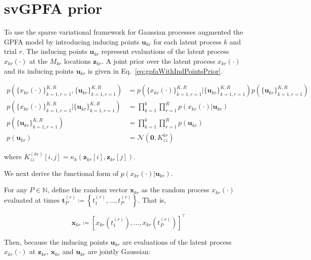 \documentclass[12pt]{article}
\begin{document}
\section{svGPFA prior}

To use the sparse variational framework for Gaussian processes \citet{dunckerAndSahani18} augmented the GPFA model by introducing inducing
points $\mathbf{u}_{kr}$ for each latent process $k$ and trial $r$. The
inducing points $\mathbf{\mathbf{u}}_{kr}$ represent evaluations of the latent
process $x_{kr}(\cdot)$ at the $M_{kr}$ locations $\mathbf{\mathbf{z}}_{kr}$. A
joint prior over the latent process $x_{kr}(\cdot)$ and its inducing points
$\mathbf{u}_{kr}$ is given in Eq.~\ref{eq:gpfaWithIndPointsPrior}.

\begin{equation}
    \begin{aligned}
        p(\{x_{kr}(\cdot)\}_{k=1,r=1}^{K,R},\{\mathbf{u}_{kr}\}_{k=1,r=1}^{K,R}) &= p(\{x_{kr}(\cdot)\}_{k=1,r=1}^{K,R}|\{\mathbf{u}_{kr}\}_{k=1,r=1}^{K,R})p(\{\mathbf{u}_{kr}\}_  {k=1,r=1}^{K,R})\\
        p(\{x_{kr}(\cdot)\}_{k=1,r=1}^{K,R}|\{\mathbf{u}_{kr}\}_  {k=1,r=1}^{K,R}) &= \prod_{k=1}^k\prod_{r=1}^{R}p(x_{kr}(\cdot)|\mathbf{u}_{kr})\\
        p(\{\mathbf{u}_{kr}\}_{k=1,r=1}^{K,R})&=\prod_{k=1}^k\prod_{r=1}^{R}p(\mathbf{u}_{kr})\\
        p(\mathbf{u}_{kr})&=\mathcal{N}(\mathbf{0},K^{kr}_{zz})
    \end{aligned}
    \label{eq:gpfaWithIndPointsPrior}
\end{equation}

\noindent where $K_{zz}^{(kr)}[i,j]=\kappa_k(\mathbf{z}_{kr}[i],\mathbf{z}_{kr}[j])$.

We next derive the functional form of $p(x_{kr}(\cdot)|\mathbf{u}_{kr})$.

For any $P\in\mathbb{N}$, define the random vector $\mathbf{x}_{kr}$ as the random process
$x_{kr}(\cdot)$ evaluated at times
$\mathbf{t}_P^{(r)}\coloneqq\left\{t_1^{(r)},\ldots,t_P^{(r)}\right\}$. That
is,

\begin{equation}
    \mathbf{x}_{kr}\coloneqq[x_{kr}(t_1^{(r)}),\ldots,x_{kr}(t_P^{(r)})]^\intercal
    \label{eq:latentVector}
\end{equation}

Then, because the inducing points $\mathbf{u}_{kr}$ are evaluations of the
latent process $x_{kr}(\cdot)$ at $\mathbf{z}_{kr}$, $\mathbf{x}_{kr}$ and
$\mathbf{u}_{kr}$ are jointly Gaussian:
\end{document}

